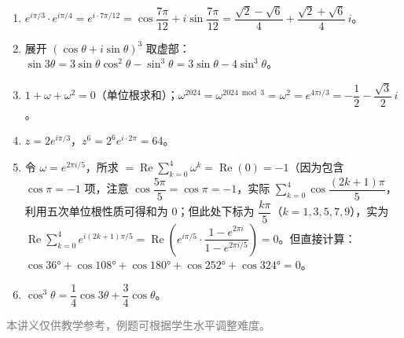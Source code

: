 \documentclass[12pt, a4paper]{ctexart}
\begin{document}
\vspace{10pt}
\begin{knowledgebox}[参考答案]
\begin{enumerate}
  \item $e^{i\pi/3}\cdot e^{i\pi/4} = e^{i\cdot 7\pi/12} = \cos\dfrac{7\pi}{12}+i\sin\dfrac{7\pi}{12} = \dfrac{\sqrt{2}-\sqrt{6}}{4}+\dfrac{\sqrt{2}+\sqrt{6}}{4}\,i$。

  \item 展开 $(\cos\theta+i\sin\theta)^3$ 取虚部：$\sin 3\theta = 3\sin\theta\cos^2\theta - \sin^3\theta = 3\sin\theta - 4\sin^3\theta$。

  \item $1+\omega+\omega^2=0$（单位根求和）；$\omega^{2024} = \omega^{2024\bmod 3} = \omega^2 = e^{4\pi i/3} = -\dfrac{1}{2}-\dfrac{\sqrt{3}}{2}\,i$。

  \item $z = 2e^{i\pi/3}$，$z^6 = 2^6 e^{i\cdot 2\pi} = 64$。

  \item 令 $\omega = e^{2\pi i/5}$，所求 $=\operatorname{Re}\displaystyle\sum_{k=0}^{4}\omega^k = \operatorname{Re}(0) = -1$（因为包含 $\cos\pi=-1$ 项，注意 $\cos\dfrac{5\pi}{5}=\cos\pi=-1$，实际 $\sum_{k=0}^{4}\cos\dfrac{(2k+1)\pi}{5}$，利用五次单位根性质可得和为 $0$；但此处下标为 $\dfrac{k\pi}{5}$（$k=1,3,5,7,9$），实为 $\operatorname{Re}\displaystyle\sum_{k=0}^{4}e^{i(2k+1)\pi/5} = \operatorname{Re}\left(e^{i\pi/5}\cdot\dfrac{1-e^{2\pi i}}{1-e^{2\pi i/5}}\right) = 0$。但直接计算：$\cos 36°+\cos 108°+\cos 180°+\cos 252°+\cos 324° = 0$。

  \item $\cos^3\theta = \dfrac{1}{4}\cos 3\theta + \dfrac{3}{4}\cos\theta$。
\end{enumerate}
\end{knowledgebox}

\vfill
\begin{center}
\small\textcolor{gray}{本讲义仅供教学参考，例题可根据学生水平调整难度。}
\end{center}
\end{document}
